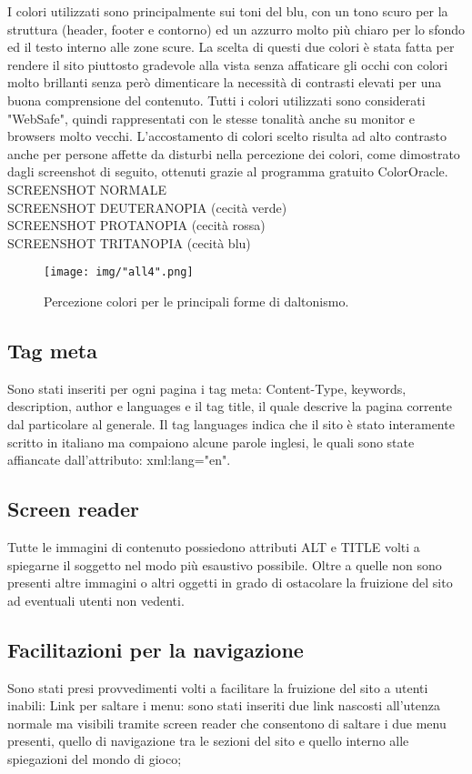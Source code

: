 \documentclass{article}
\begin{document}
I colori utilizzati sono principalmente sui toni del blu, con un tono scuro per la struttura (header, footer e contorno) ed un azzurro molto più chiaro per lo sfondo ed il testo interno alle zone scure. La scelta di questi due colori è stata fatta per rendere il sito piuttosto gradevole alla vista senza affaticare gli occhi con colori molto brillanti senza però dimenticare la necessità di contrasti elevati per una buona comprensione del contenuto.
	Tutti i colori utilizzati sono considerati "WebSafe", quindi rappresentati con le stesse tonalità anche su monitor e browsers molto vecchi.
	L'accostamento di colori scelto risulta ad alto contrasto anche per persone affette da disturbi nella percezione dei colori, come dimostrato dagli screenshot di seguito, ottenuti grazie al programma gratuito ColorOracle. \\
	SCREENSHOT NORMALE \\
	SCREENSHOT DEUTERANOPIA (cecità verde) \\
	SCREENSHOT PROTANOPIA (cecità rossa)  \\
	SCREENSHOT TRITANOPIA (cecità blu)  \\
	
	
	 \begin{figure}
				\centering
				\texttt{[image: img/"all4".png]}
				\caption{Percezione colori per le principali forme di daltonismo.}
			\end{figure}
			\newpage

\subsection{Tag meta}
	Sono stati inseriti per ogni pagina i tag meta: Content-Type, keywords, description, author e languages e il tag title, 
	il quale descrive la pagina corrente dal particolare al generale. 
	Il tag languages indica che il sito è stato interamente scritto in italiano ma compaiono alcune parole inglesi, 
	le quali sono state affiancate dall'attributo: xml:lang="en".

\subsection{Screen reader}
Tutte le immagini di contenuto possiedono attributi ALT e TITLE volti a spiegarne il soggetto nel modo più esaustivo possibile. Oltre a quelle non sono presenti altre immagini o altri oggetti in grado di ostacolare la fruizione del sito ad eventuali utenti non vedenti.

\subsection{Facilitazioni per la navigazione}
Sono stati presi provvedimenti volti a facilitare la fruizione del sito a utenti inabili:
		Link per saltare i menu: sono stati inseriti due link nascosti all'utenza normale ma visibili tramite screen reader che consentono di saltare i due menu presenti, quello di navigazione tra le sezioni del sito e quello interno alle spiegazioni del mondo di gioco;
		
\end{document}
